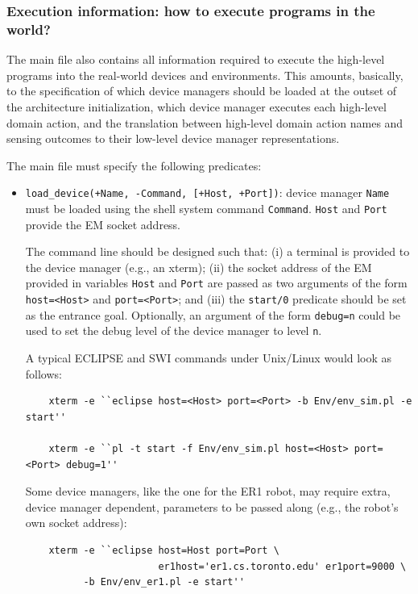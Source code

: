 \documentclass[11pt]{article}
\begin{document}
\subsubsection{Execution information: how to execute programs in the world?}

The main file also contains all information required to execute the high-level
programs into the real-world devices and environments.
%
This amounts, basically, to the specification of which device managers should
be loaded at the outset of the architecture initialization, which device
manager executes each high-level domain action, and the translation 
between high-level domain action names and sensing outcomes to their low-level
device manager representations.

The main file must specify the following predicates:
\begin{itemize}
\item \texttt{load\_device(+Name, -Command, [+Host, +Port])}: device manager
 \texttt{Name} must be loaded using the shell system command \texttt{Command}.
 \texttt{Host} and \texttt{Port} provide the EM socket address.
  
  The command line should be designed such that: (i) a terminal is provided to
  the device manager (e.g., an xterm); (ii) the socket address of the EM
  provided in variables \texttt{Host} and \texttt{Port} are passed as two
  arguments of the form \texttt{host=<Host>} and \texttt{port=<Port>};
  and (iii) the \texttt{start/0} predicate should be set as the entrance
  goal. 
  Optionally, an argument of the form \texttt{debug=n} could be used to set
  the debug level of the device manager to level \texttt{n}.
  
  A typical ECLIPSE and SWI commands under Unix/Linux would look as follows:
  
  \begin{verbatim}
    xterm -e ``eclipse host=<Host> port=<Port> -b Env/env_sim.pl -e start''

    xterm -e ``pl -t start -f Env/env_sim.pl host=<Host> port=<Port> debug=1''
  \end{verbatim}

  
  Some device managers, like the one for the ER1 robot, may require extra,
  device manager dependent, parameters to be passed along (e.g., the robot's
  own socket address):
  
  \begin{verbatim}
    xterm -e ``eclipse host=Host port=Port \
                       er1host='er1.cs.toronto.edu' er1port=9000 \
          -b Env/env_er1.pl -e start''
  \end{verbatim}
  

\end{itemize}
\end{document}
